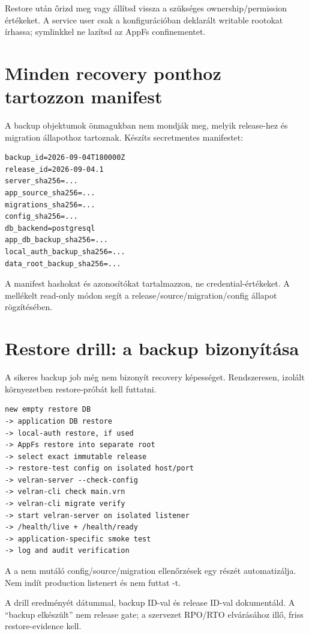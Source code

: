 Restore után őrizd meg vagy állítsd vissza a szükséges ownership/permission értékeket. A service user csak a konfigurációban deklarált writable rootokat írhassa; symlinkkel ne lazítsd az AppFs confinementet.

\section{Minden recovery ponthoz tartozzon manifest}

A backup objektumok önmagukban nem mondják meg, melyik release-hez és migration állapothoz tartoznak. Készíts secretmentes manifestet:

\begin{lstlisting}
backup_id=2026-09-04T180000Z
release_id=2026-09-04.1
server_sha256=...
app_source_sha256=...
migrations_sha256=...
config_sha256=...
db_backend=postgresql
app_db_backup_sha256=...
local_auth_backup_sha256=...
data_root_backup_sha256=...
\end{lstlisting}

A manifest hashokat és azonosítókat tartalmazzon, ne credential-értékeket. A mellékelt  read-only módon segít a release/source/migration/config állapot rögzítésében.

\section{Restore drill: a backup bizonyítása}

A sikeres backup job még nem bizonyít recovery képességet. Rendszeresen, izolált környezetben restore-próbát kell futtatni.

\begin{lstlisting}
new empty restore DB
-> application DB restore
-> local-auth restore, if used
-> AppFs restore into separate root
-> select exact immutable release
-> restore-test config on isolated host/port
-> velran-server --check-config
-> velran-cli check main.vrn
-> velran-cli migrate verify
-> start velran-server on isolated listener
-> /health/live + /health/ready
-> application-specific smoke test
-> log and audit verification
\end{lstlisting}

A  a nem mutáló config/source/migration ellenőrzések egy részét automatizálja. Nem indít production listenert és nem futtat -t.

A drill eredményét dátummal, backup ID-val és release ID-val dokumentáld. A ``backup elkészült'' nem release gate; a szervezet RPO/RTO elvárásához illő, friss restore-evidence kell.

